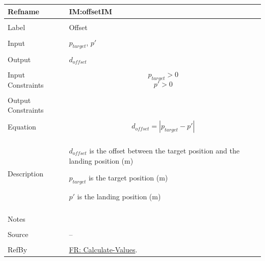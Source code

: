 \documentclass[12pt]{article}
\begin{document}
\noindent \begin{minipage}{\textwidth}
\begin{tabular}{p{} p{}}
\toprule \textbf{Refname} & \textbf{IM:offsetIM}
\label{IM:offsetIM}
\\ \midrule \\
Label & Offset
\\ \midrule \\
Input & ${p_{target}}$, $p'$
\\ \midrule \\
Output & ${d_{offset}}$
\\ \midrule \\
Input Constraints & \begin{displaymath}
                    {p_{target}}>0
                    \end{displaymath}
                    \begin{displaymath}
                    p'>0
                    \end{displaymath}
\\ \midrule \\
Output Constraints & 
\\ \midrule \\
Equation & \begin{displaymath}
           {d_{offset}}=|{p_{target}}-p'|
           \end{displaymath}
\\ \midrule \\
Description & \begin{symbDescription}
              \item{${d_{offset}}$ is the offset between the target position and the landing position (m)}
              \item{${p_{target}}$ is the target position (m)}
              \item{$p'$ is the landing position (m)}
              \end{symbDescription}
\\ \midrule \\
Notes & 
\\ \midrule \\
Source & --
\\ \midrule \\
RefBy & \hyperref[calcValues]{FR: Calculate-Values}.
\\ \bottomrule \end{tabular}
\end{minipage}
\par~
\end{document}
